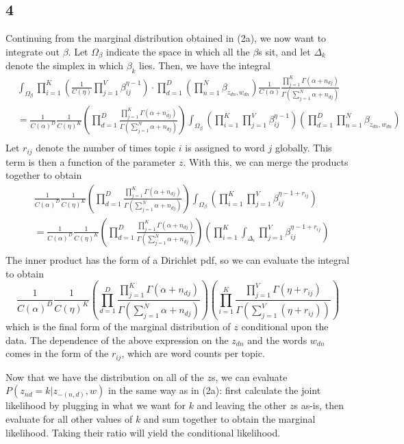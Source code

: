 \documentclass{article}
\begin{document}
\subsection*{4}
Continuing from the marginal distribution obtained in (2a), we now want to integrate out $\beta$. Let $\Omega_\beta$ indicate the space in which all the $\beta$s sit, and let $\Delta_k$ denote the simplex in which $\beta_k$ lies. Then, we have the integral
\begin{align*}
    &\int_{\Omega_\beta}\prod_{i=1}^K\left(\frac{1}{C(\eta)}\prod_{j=1}^V\beta_{ij}^{\eta-1}\right)\cdot\prod_{d=1}^D\left(\prod_{n=1}^N\beta_{z_{dn},w_{dn}}\right)\frac{1}{C(\alpha)}\frac{\prod_{j=1}^K\Gamma(\alpha+n_{dj})}{\Gamma(\sum_{j=1}^N\alpha+n_{dj})}\\
    &=\frac{1}{C(\alpha)^D}\frac{1}{C(\eta)^K}\left(\prod_{d=1}^D\frac{\prod_{j=1}^K\Gamma(\alpha+n_{dj})}{\Gamma(\sum_{j=1}^N\alpha+n_{dj})}\right)\int_{\Omega_\beta}\left(\prod_{i=1}^K\prod_{j=1}^V\beta_{ij}^{\eta-1}\right)\left(\prod_{d=1}^D\prod_{n=1}^N\beta_{z_{dn},w_{dn}}\right)\\
\end{align*}
Let $r_{ij}$ denote the number of times topic $i$ is assigned to word $j$ globally. This term is then a function of the parameter $z$. With this, we can merge the products together to obtain
\begin{align*}
    &\frac{1}{C(\alpha)^D}\frac{1}{C(\eta)^K}\left(\prod_{d=1}^D\frac{\prod_{j=1}^K\Gamma(\alpha+n_{dj})}{\Gamma(\sum_{j=1}^N\alpha+n_{dj})}\right)\int_{\Omega_\beta}\left(\prod_{i=1}^K\prod_{j=1}^V\beta_{ij}^{\eta-1+r_{ij}}\right)\\
    &=\frac{1}{C(\alpha)^D}\frac{1}{C(\eta)^K}\left(\prod_{d=1}^D\frac{\prod_{j=1}^K\Gamma(\alpha+n_{dj})}{\Gamma(\sum_{j=1}^N\alpha+n_{dj})}\right)\left(\prod_{i=1}^K\int_{\Delta_i}\prod_{j=1}^V\beta_{ij}^{\eta-1+r_{ij}}\right)\\
\end{align*}
The inner product has the form of a Dirichlet pdf, so we can evaluate the integral to obtain
\[\frac{1}{C(\alpha)^D}\frac{1}{C(\eta)^K}\left(\prod_{d=1}^D\frac{\prod_{j=1}^K\Gamma(\alpha+n_{dj})}{\Gamma(\sum_{j=1}^N\alpha+n_{dj})}\right)\left(\prod_{i=1}^K\frac{\prod_{j=1}^V\Gamma(\eta+r_{ij})}{\Gamma\left(\sum_{j=1}^V(\eta+r_{ij})\right)}\right)\]
which is the final form of the marginal distribution of $z$ conditional upon the data. The dependence of the above expression on the $z_{dn}$ and the words $w_{dn}$ comes in the form of the $r_{ij}$, which are word counts per topic.

Now that we have the distribution on all of the $z$s, we can evaluate $P(z_{nd}=k|z_{-(n,d)},w)$ in the same way as in (2a): first calculate the joint likelihood by plugging in what we want for $k$ and leaving the other $z$s as-is, then evaluate for all other values of $k$ and sum together to obtain the marginal likelihood. Taking their ratio will yield the conditional likelihood.
\end{document}
